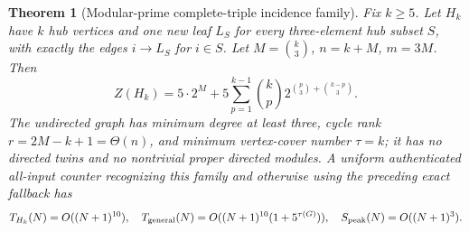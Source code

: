 \documentclass[11pt]{article}
\newtheorem{theorem}{Theorem}
\begin{document}
\begin{theorem}[Modular-prime complete-triple incidence family]
Fix $k\ge5$. Let $H_k$ have $k$ hub vertices and one new
leaf $L_S$ for every three-element hub subset $S$, with
exactly the edges $i\to L_S$ for $i\in S$.
Let $M=\binom{k}{3}$, $n=k+M$, $m=3M$. Then
\[
\boxed{\displaystyle
Z(H_k)=5\cdot2^M+
5\sum_{p=1}^{k-1}\binom{k}{p}
2^{\binom{p}{3}+\binom{k-p}{3}}.}
\]
The undirected graph has minimum degree at least three,
cycle rank $r=2M-k+1=\Theta(n)$, and minimum vertex-cover
number $\tau=k$; it has no directed twins and no nontrivial
proper directed modules. A uniform authenticated
\emph{all-input} counter recognizing this family and
otherwise using the preceding exact fallback has
\[
T_{H_k}(N)=O((N+1)^{10}),\quad
T_{\rm general}(N)=O((N+1)^{10}(1+5^{\tau(G)})),\quad
S_{\rm peak}(N)=O((N+1)^3).
\]
\end{theorem}
\end{document}
